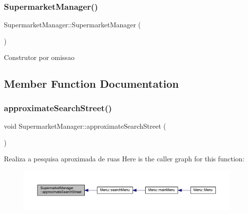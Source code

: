 \subsubsection{\texorpdfstring{Supermarket\+Manager()}{SupermarketManager()}}
{\footnotesize\ttfamily Supermarket\+Manager\+::\+Supermarket\+Manager (\begin{DoxyParamCaption}{ }\end{DoxyParamCaption})}

Construtor por omissao 

\subsection{Member Function Documentation}
\mbox{\label{class_supermarket_manager_a0aa3fa8dab27db5f4960b840a2dd871c}} 
\subsubsection{\texorpdfstring{approximate\+Search\+Street()}{approximateSearchStreet()}}
{\footnotesize\ttfamily void Supermarket\+Manager\+::approximate\+Search\+Street (\begin{DoxyParamCaption}{ }\end{DoxyParamCaption})}

Realiza a pesquisa aproximada de ruas Here is the caller graph for this function\+:
\nopagebreak
\begin{figure}[H]
\begin{center}
\leavevmode
\includegraphics[width=350pt]{class_supermarket_manager_a0aa3fa8dab27db5f4960b840a2dd871c_icgraph}
\end{center}
\end{figure}
\mbox{\label{class_supermarket_manager_af797d69ada273a0582a619a0fc8f0638}} 
